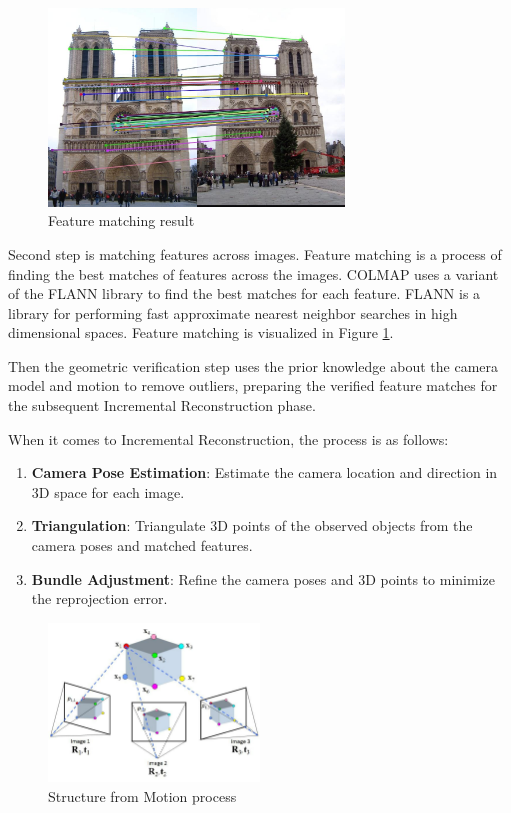 \begin{figure}[h]
  \centering
  \includegraphics[width=0.7\textwidth]{images/related-work/feature-matching.jpg}
  \caption{Feature matching result}
  \label{fig:matching-features}
\end{figure}

Second step is matching features across images. Feature matching is a process of finding the best matches of features across the images. COLMAP uses a variant of the FLANN \cite{flann} library to find the best matches for each feature. FLANN is a library for performing fast approximate nearest neighbor searches in high dimensional spaces. Feature matching is visualized in Figure \ref{fig:matching-features}.

Then the geometric verification step uses the prior knowledge about the camera model and motion to remove outliers, preparing the verified feature matches for the subsequent Incremental Reconstruction phase.

When it comes to Incremental Reconstruction, the process is as follows:
\begin{enumerate}
  \item \textbf{Camera Pose Estimation}: Estimate the camera location and direction in 3D space for each image.
  \item \textbf{Triangulation}: Triangulate 3D points of the observed objects from the camera poses and matched features.
  \item \textbf{Bundle Adjustment}: Refine the camera poses and 3D points to minimize the reprojection error.
\end{enumerate}

\begin{figure}[h]
  \centering
  \includegraphics[width=0.5\textwidth]{images/related-work/Structure-from-Motion-SfM-process-is-illustrated-The-structure-in-the.png}
  \caption{Structure from Motion process}
  \label{fig:structure-from-motion}
\end{figure}

